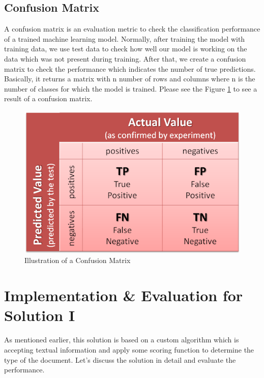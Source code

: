 \subsection{Confusion Matrix}
A confusion matrix is an evaluation metric to check the classification performance of a trained machine learning model. Normally, after training the model with training data, we use test data to check how well our model is working on the data which was not present during training. After that, we create a confusion matrix to check the performance which indicates the number of true predictions. Basically, it returns a matrix with n number of rows and columns where n is the number of classes for which the model is trained. Please see the Figure \ref{cm} to see a result of a confusion matrix.
\begin{figure}[H]
\centering
\includegraphics[scale=0.7]{images/Chapter5/cm.png}
\caption{Illustration of a Confusion Matrix \cite{conf_matrix}}
\label{cm}
\end{figure}
\par
\section{Implementation \& Evaluation for Solution I}
As mentioned earlier, this solution is based on a custom algorithm which is accepting textual information and apply some scoring function to determine the type of the document. Let's discuss the solution in detail and evaluate the performance.

